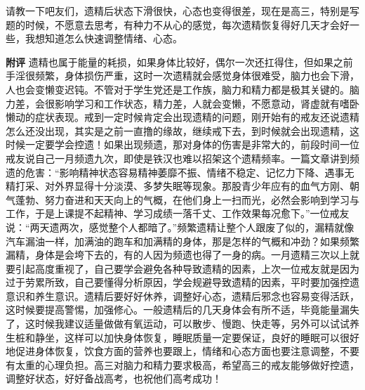 \begin{case}
    请教一下吧友们，遗精后状态下滑很快，心态也变得很差，现在是高三，特别是写题的时候，不愿意去思考，有种力不从心的感觉，每次遗精恢复得好几天才会好一些，我想知道怎么快速调整情绪、心态。

    \textbf{附评} 遗精也属于能量的耗损，如果身体比较好，偶尔一次还扛得住，但如果之前手淫很频繁，身体损伤严重，这时一次遗精就会感觉身体很难受，脑力也会下滑，人也会变懒变迟钝。不管对于学生党还是工作族，脑力和精力都是极其关键的。脑力差，会很影响学习和工作状态，精力差，人就会变懒，不愿意动，肾虚就有嗜卧懒动的症状表现。戒到一定时候肯定会出现遗精的问题，刚开始有的戒友还说遗精怎么还没出现，其实是之前一直撸的缘故，继续戒下去，到时候就会出现遗精，这时候一定要学会控遗！如果出现频遗，那对身体的伤害是非常大的，前段时间一位戒友说自己一月频遗九次，即使是铁汉也难以招架这个遗精频率。一篇文章讲到频遗的危害：“影响精神状态容易精神萎靡不振、情绪不稳定、记忆力下降、遇事无精打采、对外界显得十分淡漠、多梦失眠等现象。那股青少年应有的血气方刚、朝气蓬勃、努力奋进和天天向上的气概，在他们身上一扫而光，必然会影响到学习与工作，于是上课提不起精神、学习成绩一落千丈、工作效果每况愈下。”一位戒友说：“两天遗两次，感觉整个人都暗了。”频繁遗精让整个人跟废了似的，漏精就像汽车漏油一样，加满油的跑车和加满精的身体，那是怎样的气概和冲劲？如果频繁漏精，身体是会垮下去的，有的人因为频遗也得了一身的病。一月遗精三次以上就要引起高度重视了，自己要学会避免各种导致遗精的因素，上次一位戒友就是因为过于劳累所致，自己要懂得分析原因，学会规避导致遗精的因素，平时要加强控遗意识和养生意识。遗精后要好好休养，调整好心态，遗精后邪念也容易变得活跃，这时候要提高警惕，加强修心。一般遗精后的几天身体会有所不适，毕竟能量漏失了，这时候我建议适量做做有氧运动，可以散步、慢跑、快走等，另外可以试试养生桩和静坐，这样可以加快身体恢复，睡眠质量一定要保证，良好的睡眠可以很好地促进身体恢复，饮食方面的营养也要跟上，情绪和心态方面也要注意调整，不要有太重的心理负担。高三对脑力和精力要求极高，希望高三的戒友能够做好控遗，调整好状态，好好备战高考，也祝他们高考成功！
\end{case}

